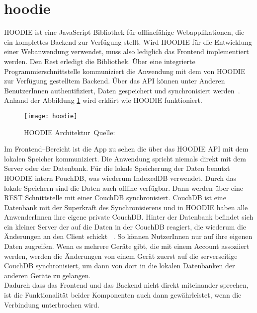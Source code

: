 \section{hoodie}
HOODIE ist eine JavaScript Bibliothek für offlinefähige Webapplikationen, die ein komplettes Backend zur Verfügung stellt. Wird HOODIE für die Entwicklung einer Webanwendung verwendet, muss also lediglich das Frontend implementiert werden. Den Rest erledigt die Bibliothek. Über eine integrierte Programmierschnittstelle kommuniziert die Anwendung mit dem von HOODIE zur Verfügung gestelltem Backend. Über das \gls{API} können unter Anderen BenutzerInnen authentifiziert, Daten gespeichert und synchronisiert werden~\cite{hoodie}.\\
Anhand der Abbildung \ref{fig:hoodie} wird erklärt wie HOODIE funktioniert.
\begin{figure}[H]
  \centering
  \texttt{[image: hoodie]}
  \grayRule
  \caption[HOODIE Architektur]{HOODIE Architektur~Quelle:~\cite{hoodie-how}}
  \label{fig:hoodie}
\end{figure}
Im Frontend--Bereicht ist die App zu sehen die über das HOODIE \gls{API} mit dem lokalen Speicher kommuniziert. Die Anwendung spricht niemals direkt mit dem Server oder der Datenbank. Für die lokale Speicherung der Daten benutzt HOODIE intern PouchDB, was wiederum IndexedDB verwendet. Durch das lokale Speichern sind die Daten auch offline verfügbar. Dann werden über eine \gls{REST} Schnittstelle mit einer CouchDB synchronisiert. CouchDB ist eine Datenbank mit der Superkraft des Synchronisierens und in HOODIE haben alle AnwenderInnen ihre eigene private CouchDB. Hinter der Datenbank befindet sich ein kleiner Server der auf die Daten in der CouchDB reagiert, die wiederum die Änderungen an den Client schickt ~\cite{hoodie-how}.
So können NutzerInnen nur auf ihre eigenen Daten zugreifen. Wenn es mehrere Geräte gibt, die mit einem Account assoziiert werden, werden die Änderungen von einem Gerät zuerst auf die serverseitige CouchDB synchronisiert, um dann von dort in die lokalen Datenbanken der anderen Geräte zu gelangen.\\
Dadurch dass das Frontend und das Backend nicht direkt miteinander sprechen, ist die Funktionalität beider Komponenten auch dann gewährleistet, wenn die Verbindung unterbrochen wird.